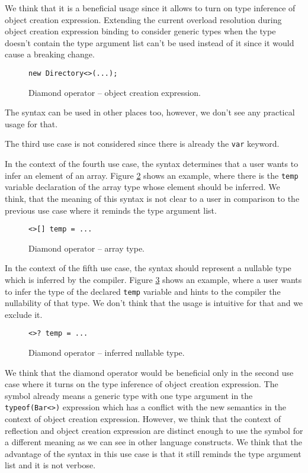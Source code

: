 We think that it is a beneficial usage since it allows to turn on type inference of object creation expression.
Extending the current overload resolution during object creation expression binding to consider generic types when the type doesn't contain the type argument list can't be used instead of it since it would cause a breaking change.
\begin{figure}[h!]
\begin{lstlisting}[style=csharp]
new Directory<>(...);
\end{lstlisting}
\caption{Diamond operator -- object creation expression.}
\label{img41b:opDi2}
\end{figure}
The syntax can be used in other places too, however, we don't see any practical usage for that.
\par
The third use case is not considered since there is already the \texttt{var} keyword.
\par
In the context of the fourth use case, the syntax determines that a user wants to infer an element of an array.
Figure \ref{img43:opDi4} shows an example, where there is the \texttt{temp} variable declaration of the array type whose element should be inferred.
We think, that the meaning of this syntax is not clear to a user in comparison to the previous use case where it reminds the type argument list.
\begin{figure}[h]
\begin{lstlisting}[style=csharp]
<>[] temp = ...
\end{lstlisting}
\caption{Diamond operator -- array type.}
\label{img43:opDi4}
\end{figure}
\par
In the context of the fifth use case, the syntax should represent a nullable type which is inferred by the compiler.
Figure \ref{img44:opDi5} shows an example, where a user wants to infer the type of the declared \texttt{temp} variable and hints to the compiler the nullability of that type.
We don't think that the usage is intuitive for that and we exclude it.
\begin{figure}[h!]
\begin{lstlisting}[style=csharp]
<>? temp = ...
\end{lstlisting}
\caption{Diamond operator -- inferred nullable type.}
\label{img44:opDi5}
\end{figure}
\par
We think that the diamond operator would be beneficial only in the second use case where it turns on the type inference of object creation expression.
The symbol already means a generic type with one type argument in the \texttt{typeof(Bar<>)} expression which has a conflict with the new semantics in the context of object creation expression.
However, we think that the context of reflection and object creation expression are distinct enough to use the symbol for a different meaning as we can see in other language constructs.
We think that the advantage of the syntax in this use case is that it still reminds the type argument list and it is not verbose.

